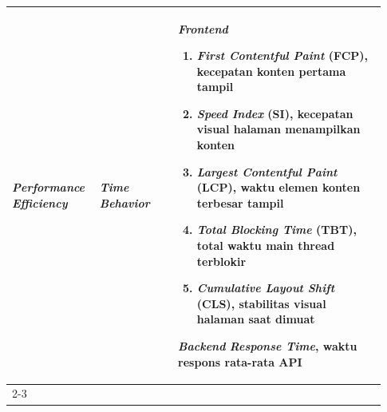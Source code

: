\begin{longtable}{|p{0.2\linewidth}|p{0.2\linewidth}|p{0.53\linewidth}|}
      \textbf{\textit{Performance Efficiency}}                    & \textbf{\textit{Time Behavior}}                                                                                                                         & \textbf{\textit{Frontend}} \begin{enumerate}[before=\vspace{8pt}, after=\vspace{5pt}, leftmargin=*, nosep, series=PT] \item \textit{First Contentful Paint} (FCP), kecepatan konten pertama tampil \item \textit{Speed Index} (SI), kecepatan visual halaman menampilkan konten \item \textit{Largest Contentful Paint} (LCP), waktu elemen konten terbesar tampil \item \textit{Total Blocking Time} (TBT), total waktu main thread terblokir \item \textit{Cumulative Layout Shift} (CLS), stabilitas visual halaman saat dimuat \end{enumerate} \textbf{\textit{Backend}} \newline \vspace{8pt} \textit{Response Time}, waktu respons rata-rata
      API                                                                                                                                                                                                                                                                                                                                                                                                                                                                                                                                                                                                                                                                                                                                                                                                                                                                                                                                                                                                                                                                                                                                                                                                                                                                                                                                                                                                                                                                                                                                                                                                                                                           \\
      \cline{2-3}


\end{longtable}
